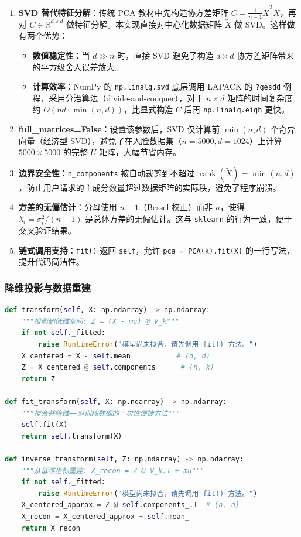 \documentclass[a4paper]{article}
\begin{document}
\begin{enumerate}
    \item \textbf{SVD 替代特征分解}：传统 PCA 教材中先构造协方差矩阵 $C = \frac{1}{n-1}\tilde{X}^T\tilde{X}$，再对 $C \in \mathbb{R}^{d \times d}$ 做特征分解。本实现直接对中心化数据矩阵 $\tilde{X}$ 做 SVD。这样做有两个优势：
    \begin{itemize}
        \item \textbf{数值稳定性}：当 $d \gg n$ 时，直接 SVD 避免了构造 $d \times d$ 协方差矩阵带来的平方级舍入误差放大。
        \item \textbf{计算效率}：NumPy 的 \texttt{np.linalg.svd} 底层调用 LAPACK 的 \texttt{?gesdd} 例程，采用分治算法（divide-and-conquer），对于 $n \times d$ 矩阵的时间复杂度约 $O(nd \cdot \min(n,d))$，比显式构造 $C$ 后再 \texttt{np.linalg.eigh} 更快。
    \end{itemize}

    \item \textbf{full\_matrices=False}：设置该参数后，SVD 仅计算前 $\min(n,d)$ 个奇异向量（经济型 SVD），避免了在人脸数据集（$n=5000, d=1024$）上计算 $5000 \times 5000$ 的完整 $U$ 矩阵，大幅节省内存。

    \item \textbf{边界安全性}：\texttt{n\_components} 被自动裁剪到不超过 $\operatorname{rank}(\tilde{X}) = \min(n, d)$，防止用户请求的主成分数量超过数据矩阵的实际秩，避免了程序崩溃。

    \item \textbf{方差的无偏估计}：分母使用 $n-1$（Bessel 校正）而非 $n$，使得 $\lambda_i = \sigma_i^2/(n-1)$ 是总体方差的无偏估计。这与 \texttt{sklearn} 的行为一致，便于交叉验证结果。

    \item \textbf{链式调用支持}：\texttt{fit()} 返回 \texttt{self}，允许 \texttt{pca = PCA(k).fit(X)} 的一行写法，提升代码简洁性。
\end{enumerate}

\subsubsection{降维投影与数据重建}

\begin{lstlisting}[language=Python, caption=PCA.transform() 与 inverse_transform()]
def transform(self, X: np.ndarray) -> np.ndarray:
    """投影到低维空间: Z = (X - mu) @ V_k"""
    if not self._fitted:
        raise RuntimeError("模型尚未拟合，请先调用 fit() 方法。")
    X_centered = X - self.mean_          # (n, d)
    Z = X_centered @ self.components_     # (n, k)
    return Z

def fit_transform(self, X: np.ndarray) -> np.ndarray:
    """拟合并降维——对训练数据的一次性便捷方法"""
    self.fit(X)
    return self.transform(X)

def inverse_transform(self, Z: np.ndarray) -> np.ndarray:
    """从低维坐标重建: X_recon = Z @ V_k.T + mu"""
    if not self._fitted:
        raise RuntimeError("模型尚未拟合，请先调用 fit() 方法。")
    X_centered_approx = Z @ self.components_.T  # (n, d)
    X_recon = X_centered_approx + self.mean_
    return X_recon
\end{lstlisting}
\end{document}
